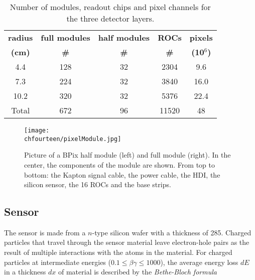 \begin{table}[!htb]
  \caption{\small Number of modules, readout chips and pixel channels for the three detector layers.}
  \smallskip
  \centering
  \begin{tabular}{|c|c|c|c|c|}
    \hline
    {\bfseries radius} & {\bfseries full modules} & {\bfseries half modules} & {\bfseries ROCs}  & {\bfseries pixels}  \\
    {\bfseries (cm)}   & {\bfseries \#          } & {\bfseries \#          } & {\bfseries \#  }  & {\bfseries (10$^6$)}\\ \hline \hline
    4.4                & 128                      & 32                       & 2304              & 9.6     \\
    7.3                & 224                      & 32                       & 3840              & 16.0      \\ 
    10.2               & 320                      & 32                       & 5376              & 22.4    \\
    Total              & 672                      & 96                       & 11520             & 48      \\ \hline
  \end{tabular}
  \label{tab:Nmodules}
\end{table}

\begin{figure}[!htb]
 \begin{center}
 \texttt{[image: \\chfourteen/pixelModule.jpg]}
 \end{center}
 \caption{Picture of a BPix half module (left) and full module (right). In the center, the components of the module are shown. From top to bottom: the Kapton signal cable, the power cable, the HDI, the silicon sensor, the 16 ROCs and the base strips.}
 \label{fig:BpixMod}
\end{figure}

\subsection{Sensor}

The sensor is made from a $n$-type silicon wafer with a thickness of 285\mum.
Charged particles that travel through the sensor material leave electron-hole pairs as the result of multiple interactions with the atoms in the material.
For charged particles at intermediate energies ($0.1 \leq \beta\gamma \leq 1000$), the average energy loss $dE$ in a thickness $dx$ of material is described by the \textit{Bethe-Bloch formula}

